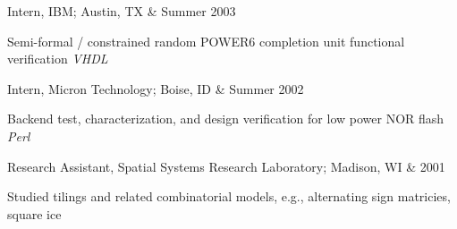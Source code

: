 \documentclass[letterpaper]{scrartcl}
\begin{document}
\begin{list1}
	\item \begin{tabular1bold} Intern, IBM; Austin, TX & Summer 2003 \end{tabular1bold}

	\begin{list2}
		\item Semi-formal / constrained random POWER6 completion unit functional verification \hfill \emph{VHDL}
	\end{list2}

%
	\item \begin{tabular1bold} Intern, Micron Technology; Boise, ID & Summer 2002 \end{tabular1bold}

	\begin{list2}
		\item Backend test, characterization, and design verification for low power NOR flash \hfill \emph{Perl}
	\end{list2}
	\item \begin{tabular1bold} Research Assistant, Spatial Systems Research Laboratory; Madison, WI & 2001 \end{tabular1bold}

	\begin{list2}
		\item Studied tilings and related combinatorial models, e.g., alternating sign matricies, square ice
	\end{list2}
\end{list1}
\end{document}
